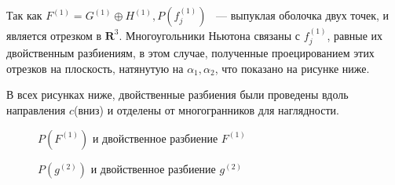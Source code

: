 \documentclass[russian]{lecture-notes}
\begin{document}
	Так как $F^{(1)} = G^{(1)} \oplus H^{(1)} ,P(f_j^{(1)})$ ~--- выпуклая оболочка двух точек, и является отрезком в $\mathbf{R}^3$. Многоугольники Ньютона связаны с $f_j^{(1)}$, равные их двойственным разбиениям, в этом случае, полученные проецированием этих отрезков на плоскость, натянутую на $\alpha_1, \alpha_2$, что показано на рисунке ниже.
	
	В всех рисунках ниже, двойственные разбиения были проведены вдоль направления $c$(вниз) и отделены от многогранников для наглядности.
	\begin{figure}[!h]
		\caption{$P(F^{(1)})$ и двойственное разбиение $F^{(1)}$}
		
	\end{figure}
\newpage
	\begin{figure}[!ht]
		\caption{$P(g^{(2)})$ и двойственное разбиение $g^{(2)}$}
	\end{figure}
\end{document}
